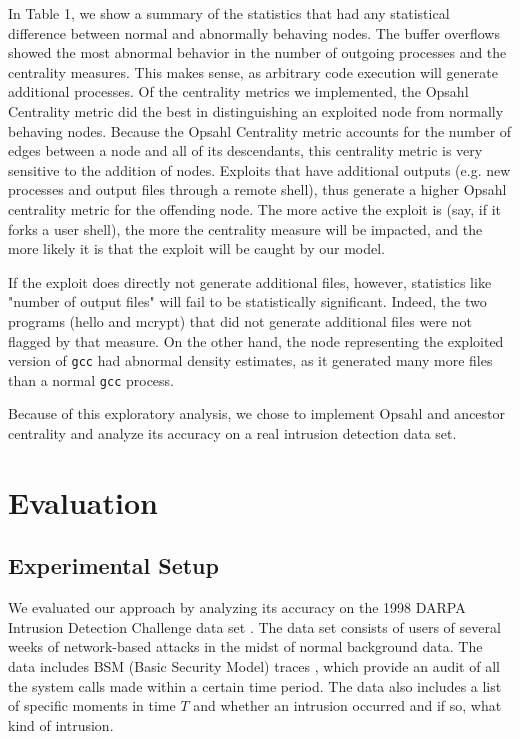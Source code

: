 \documentclass[10pt,twocolumn]{article}
\begin{document}
In Table 1, we show a summary of the statistics that had any statistical difference between normal and abnormally behaving nodes. The buffer overflows showed the most abnormal behavior in the number of outgoing processes and the centrality measures. This makes sense, as arbitrary code execution will generate additional processes. Of the centrality metrics we implemented, the Opsahl Centrality metric did the best in distinguishing an exploited node from normally behaving nodes. Because the Opsahl Centrality metric accounts for the number of edges between a node and all of its descendants, this centrality metric is very sensitive to the addition of nodes. Exploits that have additional outputs (e.g. new processes and output files through a remote shell), thus generate a higher Opsahl centrality metric for the offending node. The more active the exploit is (say, if it forks a user shell), the more the centrality measure will be impacted, and the more likely it is that the exploit will be caught by our model.

If the exploit does directly not generate additional files, however, statistics like "number of output files" will fail to be statistically significant. Indeed, the two programs (hello and mcrypt) that did not generate additional files were not flagged by that measure. On the other hand, the node representing the exploited version of \texttt{gcc} had abnormal density estimates, as it generated many more files than a normal \texttt{gcc} process. 

Because of this exploratory analysis, we chose to implement Opsahl and ancestor centrality and analyze its accuracy on a real intrusion detection data set.

%

\section{Evaluation}

\subsection{Experimental Setup}

We evaluated our approach by analyzing its accuracy on the 1998 DARPA Intrusion Detection Challenge data set \cite{darpa}.
The data set consists of users of several weeks of network-based attacks in the midst of normal
background data. The data includes BSM (Basic Security Model) traces \cite{bsm}, which provide an
audit of all the system calls made within a certain time period. The data also includes a list
of specific moments in time $T$ and whether an intrusion occurred and if so, what kind of intrusion. 
\end{document}
